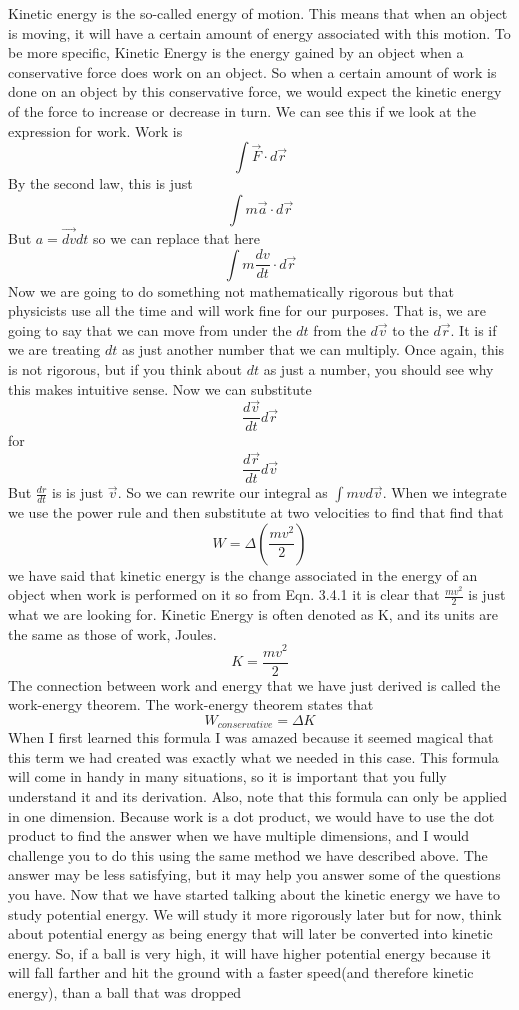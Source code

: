 \documentclass{article}[gray]
\numberwithin{equation}{subsection}
\begin{document}
Kinetic energy is the so-called energy of motion. This means that when an object is moving, it  will have a certain amount of energy associated with this motion. To be more specific, Kinetic Energy is the energy gained by an object when a conservative force does work on an object. So when a certain amount of work is done on an object by this conservative force, we would expect the kinetic energy of the force to increase or decrease in turn. We can see this if we look at the expression for work. Work is $$\int{\vec{F} \cdot d\vec{r}}$$ By the second law, this is just $$\int{m\vec{a} \cdot d\vec{r}}$$ But $a=\vec{dv}{dt}$ so we can replace that here $$\int{m\frac{dv}{dt} \cdot d\vec{r}}$$ Now we are going to do something not mathematically rigorous but that physicists use all the time and will work fine for our purposes. That is, we are going to say that we can move from under the $dt$ from the $d\vec{v}$ to the $d\vec{r}$. It is if we are treating $dt$ as just another number that we can multiply. Once again, this is not rigorous, but if you think about $dt$ as just a number, you should see why this makes intuitive sense. Now we can substitute $$\frac{d\vec{v}}{dt}d\vec{r}$$ for $$\frac{d\vec{r}}{dt}d\vec{v}$$ But $\frac{dr}{dt}$ is is just $\vec{v}$. So we can rewrite our integral as $\int{mv d\vec{v}}$. When we integrate we use the power rule and then substitute at two velocities to find that find that \begin{equation}W=\Delta\left(\frac{mv^2}{2}\right)\end{equation} we have said that kinetic energy is the change associated in the energy of an object when work is performed on it so from Eqn. 3.4.1 it is clear that $\frac{mv^2}{2}$ is just what we are looking for. Kinetic Energy is often denoted as K, and its units are the same as those of work, Joules. \begin{equation}K=\frac{mv^2}{2}\end{equation} The connection between work and energy that we have just derived is called the work-energy theorem. The work-energy theorem states that \begin{equation}W_{conservative}=\Delta K\end{equation} When I first learned this formula I was amazed because it seemed magical that this term we had created was exactly what we needed in this case. This formula will come in handy in many situations, so it is important that you fully understand it and its derivation. Also, note that this formula can only be applied in one dimension. Because work is a dot product, we would have to use the dot product to find the answer when we have multiple dimensions, and I would challenge you to do this using the same method we have described above. The answer may be less satisfying, but it may help you answer some of the questions you have. Now that we have started talking about the kinetic energy we have to study potential energy. We will study it more rigorously later but for now, think about potential energy as being energy that will later be converted into kinetic energy. So, if a ball is very high, it will have higher potential energy because it will fall farther and hit the ground with a faster speed(and therefore kinetic energy), than a ball that was dropped 
\end{document}
